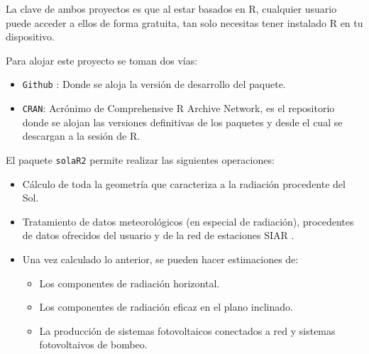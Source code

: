 La clave de ambos proyectos es que al estar basados en R, cualquier usuario puede acceder a ellos de forma gratuita, tan solo necesitas tener instalado R en tu dispositivo.

Para alojar este proyecto se toman dos vías:
\begin{itemize}
\item \texttt{Github} \cite{github}: Donde se aloja la versión de desarrollo del paquete.
\item \texttt{CRAN}: Acrónimo de Comprehensive R Archive Network, es el repositorio donde se alojan las versiones definitivas de los paquetes y desde el cual se descargan a la sesión de R.
\end{itemize}

El paquete \texttt{solaR2} permite realizar las siguientes operaciones:
\begin{itemize}
\item Cálculo de toda la geometría que caracteriza a la radiación procedente del Sol.
\item Tratamiento de datos meteorológicos (en especial de radiación), procedentes de datos ofrecidos del usuario y de la red de estaciones SIAR \cite{siar23}.
\item Una vez calculado lo anterior, se pueden hacer estimaciones de:
\begin{itemize}
\item Los componentes de radiación horizontal.
\item Los componentes de radiación eficaz en el plano inclinado.
\item La producción de sistemas fotovoltaicos conectados a red y sistemas fotovoltaivos de bombeo.
\end{itemize}
\end{itemize}


